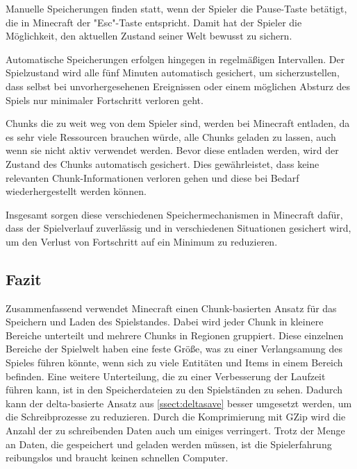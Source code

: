 Manuelle Speicherungen finden statt, wenn der Spieler die Pause-Taste betätigt, die in Minecraft der "Esc"-Taste entspricht. Damit hat der Spieler die Möglichkeit, den aktuellen Zustand seiner Welt bewusst zu sichern.\cite{minecraftSpielstandSpeicherung} 

Automatische Speicherungen erfolgen hingegen in regelmäßigen Intervallen. Der Spielzustand wird alle fünf Minuten automatisch gesichert, um sicherzustellen, dass selbst bei unvorhergesehenen Ereignissen oder einem möglichen Absturz des Spiels nur minimaler Fortschritt verloren geht.\cite{minecraftSpielstandSpeicherung}

Chunks die zu weit weg von dem Spieler sind, werden bei Minecraft entladen, da es sehr viele Ressourcen brauchen würde, alle Chunks geladen zu lassen, auch wenn sie nicht aktiv verwendet werden. Bevor diese entladen werden, wird der Zustand des Chunks automatisch gesichert. Dies gewährleistet, dass keine relevanten Chunk-Informationen verloren gehen und diese bei Bedarf wiederhergestellt werden können.\cite{minecraftSpielstandSpeicherung}

Insgesamt sorgen diese verschiedenen Speichermechanismen in Minecraft dafür, dass der Spielverlauf zuverlässig und in verschiedenen Situationen gesichert wird, um den Verlust von Fortschritt auf ein Minimum zu reduzieren.




\subsection{Fazit}
Zusammenfassend verwendet Minecraft einen Chunk-basierten Ansatz für das Speichern und Laden des Spielstandes. Dabei wird jeder Chunk in kleinere Bereiche unterteilt und mehrere Chunks in Regionen gruppiert. Diese einzelnen Bereiche der Spielwelt haben eine feste Größe, was zu einer Verlangsamung des Spieles führen könnte, wenn sich zu viele Entitäten und Items in einem Bereich befinden. Eine weitere Unterteilung, die zu einer Verbesserung der Laufzeit führen kann, ist in den Speicherdateien zu den Spielständen zu sehen. Dadurch kann der delta-basierte Ansatz aus \ref{ssect:deltasave} besser umgesetzt werden, um die Schreibprozesse zu reduzieren. Durch die Komprimierung mit GZip wird die Anzahl der zu schreibenden Daten auch um einiges verringert. Trotz der Menge an Daten, die gespeichert und geladen werden müssen, ist die Spielerfahrung reibungslos und braucht keinen schnellen Computer.\cite{minecraftHardware}



